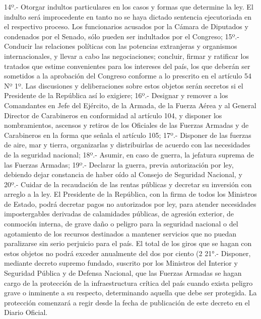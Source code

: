     14º.- Otorgar indultos particulares en los casos y formas que determine la ley. El indulto será improcedente en tanto no se haya dictado sentencia ejecutoriada en el respectivo proceso. Los funcionarios acusados por la Cámara de Diputados y condenados por el Senado, sólo pueden ser indultados por el Congreso;
    15º.- Conducir las relaciones políticas con las potencias extranjeras y organismos internacionales, y llevar a cabo las negociaciones; concluir, firmar y ratificar los tratados que estime convenientes para los intereses del país, los que deberán ser sometidos a la aprobación del Congreso conforme a lo prescrito en el artículo 54 Nº 1º. Las discusiones y deliberaciones sobre estos objetos serán secretos si el Presidente de la República así lo exigiere;
    16º.- Designar y remover a los Comandantes en Jefe del Ejército, de la Armada, de la Fuerza Aérea y al General Director de Carabineros en conformidad al artículo 104, y disponer los nombramientos, ascensos y retiros de los Oficiales de las Fuerzas Armadas y de Carabineros en la forma que señala el artículo 105;
    17º.- Disponer de las fuerzas de aire, mar y tierra, organizarlas y distribuirlas de acuerdo con las necesidades de la seguridad nacional;
    18º.- Asumir, en caso de guerra, la jefatura suprema de las Fuerzas Armadas;
    19º.- Declarar la guerra, previa autorización por ley, debiendo dejar constancia de haber oído al Consejo de Seguridad Nacional, y
    20º.- Cuidar de la recaudación de las rentas públicas y decretar su inversión con arreglo a la ley. El Presidente de la República, con la firma de todos los Ministros de Estado, podrá decretar pagos no autorizados por ley, para atender necesidades impostergables derivadas de calamidades públicas, de agresión exterior, de conmoción interna, de grave daño o peligro para la seguridad nacional o del agotamiento de los recursos destinados a mantener servicios que no puedan paralizarse sin serio perjuicio para el país. El total de los giros que se hagan con estos objetos no podrá exceder anualmente del dos por ciento (2%
    21°.- Disponer, mediante decreto supremo fundado, suscrito por los Ministros del Interior y Seguridad Pública y de Defensa Nacional, que las Fuerzas Armadas se hagan cargo de la protección de la infraestructura crítica del país cuando exista peligro grave o inminente a su respecto, determinando aquella que debe ser protegida. La protección comenzará a regir desde la fecha de publicación de este decreto en el Diario Oficial.
